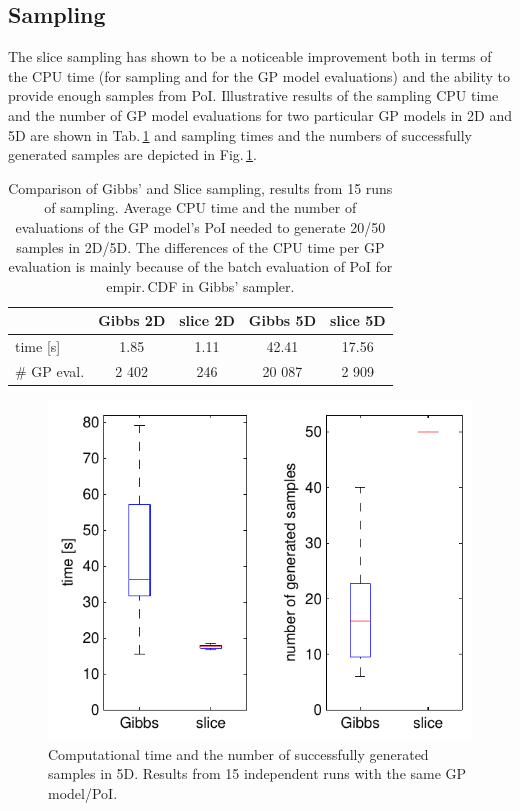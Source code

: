 \documentclass{itatnew}
\begin{document}
\subsection{Sampling}

The slice sampling has shown to be a noticeable improvement both in terms of the CPU time (for sampling and for the GP model evaluations) and the ability to provide enough samples from PoI. Illustrative results of the sampling CPU time and the number of GP model evaluations for two particular GP models in 2D and 5D are shown in Tab.\,\ref{tab:sampling} and sampling times and the numbers of successfully generated samples are depicted in Fig.\,\ref{fig:sampling}.

\begin{table}%
\begin{center}
{\small
\caption{Comparison of Gibbs' and Slice sampling, results from 15 runs of sampling. Average CPU time and the number of evaluations of the GP model's PoI needed to generate 20/50 samples in 2D/5D. The differences of the CPU time per GP evaluation is mainly because of the batch evaluation of PoI for empir.\,CDF in Gibbs' sampler.}
\vspace{1ex}
\label{tab:sampling}
\begin{tabular}{l | c c c c}
\hline
            & Gibbs 2D  & slice 2D      & Gibbs 5D      & slice 5D \\
\hline
time [s]    & 1.85      & 1.11          & 42.41         & 17.56 \\
\# GP eval. & 2 402     & 246           & 20 087        & 2 909 \\
\hline
\end{tabular}
} %
\end{center}
\end{table}

\begin{figure}
  \centering
  \includegraphics[width=0.7\linewidth]{sampling_time_popsize_5D}
  {\small
  \caption{Computational time and the number of successfully generated samples in 5D. Results from 15 independent runs with the same GP model/PoI.
  \label{fig:sampling}
  }
  }
\end{figure}
\end{document}
